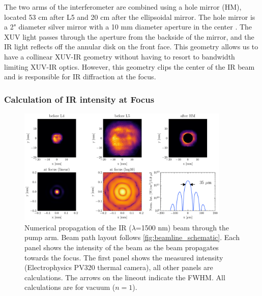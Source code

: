 The two arms of the interferometer are combined using a hole mirror (HM), located 53 cm after L5 and 20 cm after the ellipsoidal mirror. The hole mirror is a 2" diameter silver mirror with a 10 mm diameter aperture in the center \cite{peatrossHighorderHarmonicGeneration1994}. The XUV light passes through the aperture from the backside of the mirror, and the IR light reflects off the annular disk on the front face. This geometry allows us to have a collinear XUV-IR geometry without having to resort to bandwidth limiting XUV-IR optics. However, this geometry clips the center of the IR beam and is responsible for IR diffraction at the focus.

\subsubsection{Calculation of IR intensity at Focus}
\label{sec:Pump_Arm_Focus_Calculations}

\begin{figure}
	\centering
	\includegraphics[width=0.9\textwidth]{figures/chap2/pump_on_focus_calculation_8192_inferno.pdf}
	\caption{Numerical propagation of the IR ($\lambda$=1500 nm) beam through the pump arm. Beam path layout follows \cref{fig:beamline_schematic}. Each panel shows the intensity of the beam as the beam propagates towards the focus. The first panel shows the measured intensity (Electrophysics PV320 thermal camera), all other panels are calculations. The arrows on the lineout indicate the FWHM. All calculations are for vacuum ($n=1$).}
	\label{fig:pump_on_focus_calculation}
\end{figure}

